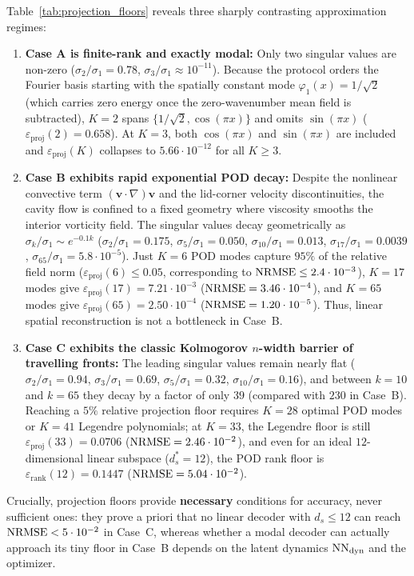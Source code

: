 Table~\ref{tab:projection_floors} reveals three sharply contrasting approximation regimes:
\begin{enumerate}[leftmargin=2em]
  \item \textbf{Case A is finite-rank and exactly modal:} Only two singular values are non-zero ($\sigma_2/\sigma_1 = 0.78$, $\sigma_3/\sigma_1 \approx 10^{-11}$). Because the protocol orders the Fourier basis starting with the spatially constant mode $\varphi_1(x) = 1/\sqrt{2}$ (which carries zero energy once the zero-wavenumber mean field is subtracted), $K=2$ spans $\{1/\sqrt{2}, \cos(\pi x)\}$ and omits $\sin(\pi x)$ ($\varepsilon_{\mathrm{proj}}(2) = 0.658$). At $K=3$, both $\cos(\pi x)$ and $\sin(\pi x)$ are included and $\varepsilon_{\mathrm{proj}}(K)$ collapses to $5.66\cdot 10^{-12}$ for all $K \ge 3$.
  \item \textbf{Case B exhibits rapid exponential POD decay:} Despite the nonlinear convective term $(\mathbf{v}\cdot\nabla)\mathbf{v}$ and the lid-corner velocity discontinuities, the cavity flow is confined to a fixed geometry where viscosity smooths the interior vorticity field. The singular values decay geometrically as $\sigma_k/\sigma_1 \sim e^{-0.1 k}$ ($\sigma_2/\sigma_1 = 0.175$, $\sigma_5/\sigma_1 = 0.050$, $\sigma_{10}/\sigma_1 = 0.013$, $\sigma_{17}/\sigma_1 = 0.0039$, $\sigma_{65}/\sigma_1 = 5.8\cdot 10^{-5}$). Just $K=6$ POD modes capture $95\%$ of the relative field norm ($\varepsilon_{\mathrm{proj}}(6) \le 0.05$, corresponding to $\mathrm{NRMSE} \le 2.4\cdot 10^{-3}$), $K=17$ modes give $\varepsilon_{\mathrm{proj}}(17) = 7.21\cdot 10^{-3}$ ($\mathrm{NRMSE} = 3.46\cdot 10^{-4}$), and $K=65$ modes give $\varepsilon_{\mathrm{proj}}(65) = 2.50\cdot 10^{-4}$ ($\mathrm{NRMSE} = 1.20\cdot 10^{-5}$). Thus, linear spatial reconstruction is not a bottleneck in Case~B.
  \item \textbf{Case C exhibits the classic Kolmogorov $n$-width barrier of travelling fronts:} The leading singular values remain nearly flat ($\sigma_2/\sigma_1 = 0.94$, $\sigma_3/\sigma_1 = 0.69$, $\sigma_5/\sigma_1 = 0.32$, $\sigma_{10}/\sigma_1 = 0.16$), and between $k=10$ and $k=65$ they decay by a factor of only $39$ (compared with $230$ in Case~B). Reaching a $5\%$ relative projection floor requires $K = 28$ optimal POD modes or $K = 41$ Legendre polynomials; at $K = 33$, the Legendre floor is still $\varepsilon_{\mathrm{proj}}(33) = 0.0706$ ($\mathrm{NRMSE} = 2.46\cdot 10^{-2}$), and even for an ideal $12$-dimensional linear subspace ($d_s^* = 12$), the POD rank floor is $\varepsilon_{\mathrm{rank}}(12) = 0.1447$ ($\mathrm{NRMSE} = 5.04\cdot 10^{-2}$).
\end{enumerate}
Crucially, projection floors provide \textbf{necessary} conditions for accuracy, never sufficient ones: they prove a priori that no linear decoder with $d_s \le 12$ can reach $\mathrm{NRMSE} < 5\cdot 10^{-2}$ in Case~C, whereas whether a modal decoder can actually approach its tiny floor in Case~B depends on the latent dynamics $\mathrm{NN}_{\mathrm{dyn}}$ and the optimizer.
